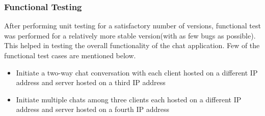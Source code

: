 \documentclass[finalReport.tex]{subfiles}
\begin{document}
\subsubsection{Functional Testing}
After performing unit testing for a satisfactory number of versions, functional test was performed for a relatively more stable version(with as few bugs as possible). This helped in testing the overall functionality of the chat application. Few of the functional test cases are mentioned below.

\begin{itemize}
\item{Initiate a two-way chat conversation with each client hosted on a different IP address and server hosted on a third IP address}
\item{Initiate multiple chats among three clients each hosted on a different IP address and server hosted on a fourth IP address}
\end{itemize}
\end{document}
